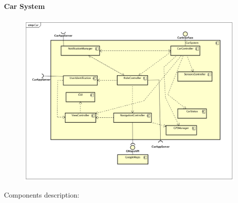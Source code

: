 \documentclass[]{article}
\let\oldparagraph\paragraph
\renewcommand{\paragraph}[1]{\oldparagraph{#1}\mbox{}}
\begin{document}
\paragraph{Car System}\label{car-system}

\begin{figure}
\centering
\includegraphics[width=1.00000\textwidth,height=1.00000\textwidth]{./comp_diagrams/CarSystem.png}
\caption{}\label{id}
\end{figure}

Components description:
\end{document}
